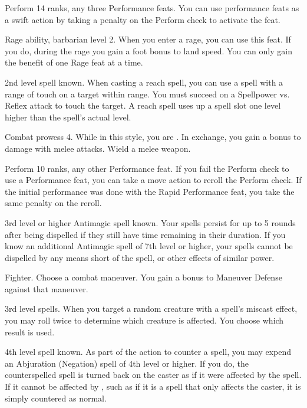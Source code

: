 \featpres Perform 14 ranks, any three Performance feats.
\featben You can use performance feats as a swift action by taking a  penalty on the Perform check to activate the feat.

\featpre Rage ability, barbarian level 2.
\featben When you enter a rage, you can use this feat. If you do, during the rage you gain a  foot bonus to land speed.
 You can only gain the benefit of one Rage feat at a time.

\featpre 2nd level spell known.
\featben When casting a reach spell, you can use a spell with a range of touch on a target within \rngclose range.
You must succeed on a Spellpower vs. Reflex attack to touch the target.
A reach spell uses up a spell slot one level higher than the spell's actual level.

\featpre Combat prowess 4.
\featben While in this style, you are .
In exchange, you gain a  bonus to damage with melee attacks.
\stylereq Wield a melee weapon.

\featpres Perform 10 ranks, any other Performance feat.
\featben If you fail the Perform check to use a Performance feat, you can take a move action to reroll the Perform check.
If the initial performance was done with the Rapid Performance feat, you take the same  penalty on the reroll.

\featpre 3rd level or higher Antimagic spell known.
\featben Your spells persist for up to 5 rounds after being dispelled if they still have time remaining in their duration.
If you know an additional Antimagic spell of 7th level or higher, your spells cannot be dispelled by any means short of the  spell, or other effects of similar power.

\featpre Fighter.
\featben Choose a combat maneuver.
You gain a  bonus to Maneuver Defense against that maneuver.

\featpre 3rd level spells.
\featben When you target a random creature with a spell's miscast effect, you may roll twice to determine which creature is affected.
You choose which result is used.

\featpre 4th level spell known.
\featben As part of the action to counter a spell, you may expend an Abjuration (Negation) spell of 4th level or higher.
If you do, the counterspelled spell is turned back on the caster as if it were affected by the 
spell.
If it cannot be affected by , such as if it is a spell that only affects the caster, it is simply countered as normal.

